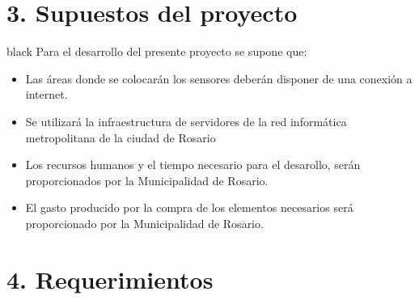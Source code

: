 \documentclass[11pt]{charter}
\begin{document}
\section{3. Supuestos del proyecto}
\label{sec:supuestos}

\begin{consigna}{black}
Para el desarrollo del presente proyecto se supone que:

\begin{itemize}
\item Las áreas donde se colocarán los sensores deberán disponer de una conexión a internet.
\item Se utilizará la infraestructura de servidores de la red informática metropolitana de la ciudad de Rosario
\item Los recursos humanos y el tiempo necesario para el desarollo, serán proporcionados por la Municipalidad de Rosario.
\item El gasto producido por la compra de los elementos necesarios será proporcionado por la Municipalidad de Rosario.
\end{itemize}

\end{consigna}

\section{4. Requerimientos}
\label{sec:requerimientos}
\end{document}
